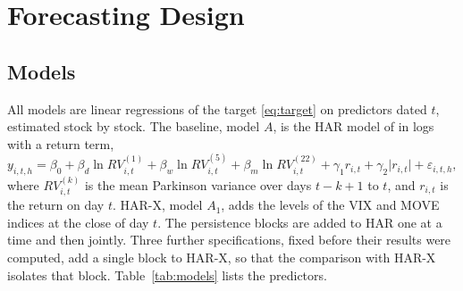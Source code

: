 \section{Forecasting Design}\label{sec:design}

\subsection{Models}

All models are linear regressions of the target \eqref{eq:target} on
predictors dated $t$, estimated stock by stock. The baseline, model $A$, is
the HAR model of \citet{corsi2009simple} in logs with a return term,
\begin{equation}
y_{i,t,h} = \beta_0 + \beta_d \ln RV^{(1)}_{i,t} + \beta_w \ln RV^{(5)}_{i,t}
+ \beta_m \ln RV^{(22)}_{i,t} + \gamma_1 r_{i,t} + \gamma_2 \lvert r_{i,t}\rvert
+ \varepsilon_{i,t,h},
\label{eq:har}
\end{equation}
where $RV^{(k)}_{i,t}$ is the mean Parkinson variance over days $t-k+1$ to
$t$, and $r_{i,t}$ is the return on day $t$. HAR-X, model $A_1$, adds the
levels of the VIX and MOVE indices at the close of day $t$. The persistence
blocks are added to HAR one at a time and then jointly. Three further
specifications, fixed before their results were computed, add a single block
to HAR-X, so that the comparison with HAR-X isolates that block.
Table~\ref{tab:models} lists the predictors.

